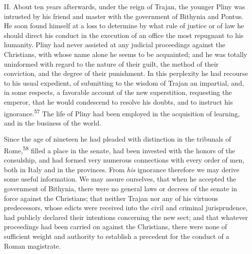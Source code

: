 




II. About ten years afterwards, under the reign of Trajan, the
younger Pliny was intrusted by his friend and master with the
government of Bithynia and Pontus. He soon found himself at a
loss to determine by what rule of justice or of law he should
direct his conduct in the execution of an office the most
repugnant to his humanity. Pliny had never assisted at any
judicial proceedings against the Christians, with whose name
alone he seems to be acquainted; and he was totally uninformed
with regard to the nature of their guilt, the method of their
conviction, and the degree of their punishment. In this
perplexity he had recourse to his usual expedient, of submitting
to the wisdom of Trajan an impartial, and, in some respects, a
favorable account of the new superstition, requesting the
emperor, that he would condescend to resolve his doubts, and to
instruct his ignorance.\textsuperscript{57} The life of Pliny had been employed in
the acquisition of learning, and in the business of the world.

Since the age of nineteen he had pleaded with distinction in the
tribunals of Rome,\textsuperscript{58} filled a place in the senate, had been
invested with the honors of the consulship, and had formed very
numerous connections with every order of men, both in Italy and
in the provinces. From \textit{his} ignorance therefore we may derive
some useful information. We may assure ourselves, that when he
accepted the government of Bithynia, there were no general laws
or decrees of the senate in force against the Christians; that
neither Trajan nor any of his virtuous predecessors, whose edicts
were received into the civil and criminal jurisprudence, had
publicly declared their intentions concerning the new sect; and
that whatever proceedings had been carried on against the
Christians, there were none of sufficient weight and authority to
establish a precedent for the conduct of a Roman magistrate.

